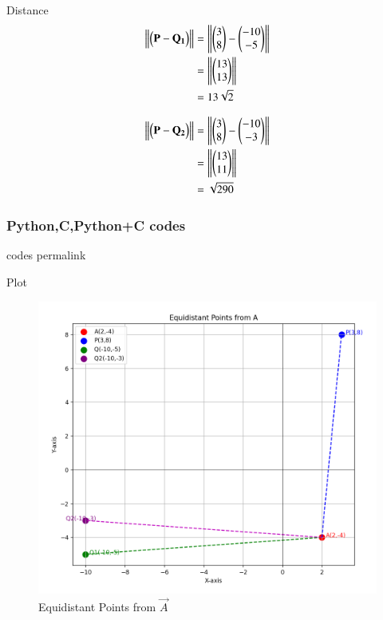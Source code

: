 \documentclass{beamer}
\begin{document}
\begin{frame}{Distance}
\begin{align}
    \left\lVert\begin{pmatrix}\mathbf{P} - \mathbf{Q_1}\end{pmatrix}\right\rVert &= \left\|\begin{pmatrix}3\\8\end{pmatrix} - \begin{pmatrix}-10\\-5\end{pmatrix}\right\| \\
    &= \left\|\begin{pmatrix}13\\13\end{pmatrix}\right\| \\
    &= 13\sqrt{2}
\end{align}

\begin{align}
    \left\lVert\begin{pmatrix}\mathbf{P} - \mathbf{Q_2}\end{pmatrix}\right\rVert &= \left\|\begin{pmatrix}3\\8\end{pmatrix} - \begin{pmatrix}-10\\-3\end{pmatrix}\right\| \\
    &= \left\|\begin{pmatrix}13\\11\end{pmatrix}\right\| \\
    &= \sqrt{290}
\end{align}

\end{frame}

\begin{frame}[fragile]
\frametitle{Python,C,Python+C codes}
codes permalink
\end{frame}

\begin{frame}{Plot}
   \begin{figure}[H]
\centering
\includegraphics[width=0.6\columnwidth]{../beamer/figs/fig1.png}
 \caption*{Equidistant Points from $\vec{A}$}
\label{fig:graph.png}
\end{figure}
\end{frame}
\end{document}
